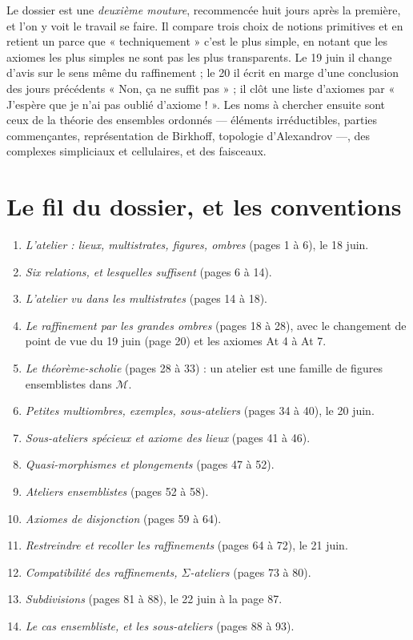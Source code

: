 \documentclass[11pt,a4paper]{article}
\begin{document}
\begin{resume}
Le dossier est une \emph{deuxième mouture}, recommencée huit jours après la
première, et l'on y voit le travail se faire. Il compare trois choix de notions
primitives et en retient un parce que « techniquement » c'est le plus simple,
en notant que les axiomes les plus simples ne sont pas les plus transparents.
Le 19 juin il change d'avis sur le sens même du raffinement ; le 20 il écrit
en marge d'une conclusion des jours précédents « Non, ça ne suffit pas » ; il
clôt une liste d'axiomes par « J'espère que je n'ai pas oublié d'axiome ! ».
Les noms à chercher ensuite sont ceux de la théorie des ensembles ordonnés
--- éléments irréductibles, parties commençantes, représentation de
Birkhoff, topologie d'Alexandrov ---, des complexes simpliciaux et
cellulaires, et des faisceaux.

\end{resume}

\section*{Le fil du dossier, et les conventions}

\begin{enumerate}
\item[1.] \emph{L'atelier : lieux, multistrates, figures, ombres} (pages 1 à 6),
le 18 juin.
\item[2.] \emph{Six relations, et lesquelles suffisent} (pages 6 à 14).
\item[3.] \emph{L'atelier vu dans les multistrates} (pages 14 à 18).
\item[4.] \emph{Le raffinement par les grandes ombres} (pages 18 à 28), avec le
changement de point de vue du 19 juin (page 20) et les axiomes At 4 à At 7.
\item[5.] \emph{Le théorème-scholie} (pages 28 à 33) : un atelier est une famille
de figures ensemblistes dans $\mathcal{M}$.
\item[6.] \emph{Petites multiombres, exemples, sous-ateliers} (pages 34 à 40),
le 20 juin.
\item[7.] \emph{Sous-ateliers spécieux et axiome des lieux} (pages 41 à 46).
\item[8.] \emph{Quasi-morphismes et plongements} (pages 47 à 52).
\item[9.] \emph{Ateliers ensemblistes} (pages 52 à 58).
\item[10.] \emph{Axiomes de disjonction} (pages 59 à 64).
\item[11.] \emph{Restreindre et recoller les raffinements} (pages 64 à 72), le
21 juin.
\item[12.] \emph{Compatibilité des raffinements, $\Sigma$-ateliers} (pages 73 à
80).
\item[13.] \emph{Subdivisions} (pages 81 à 88), le 22 juin à la page 87.
\item[14.] \emph{Le cas ensembliste, et les sous-ateliers} (pages 88 à 93).
\end{enumerate}
\end{document}
